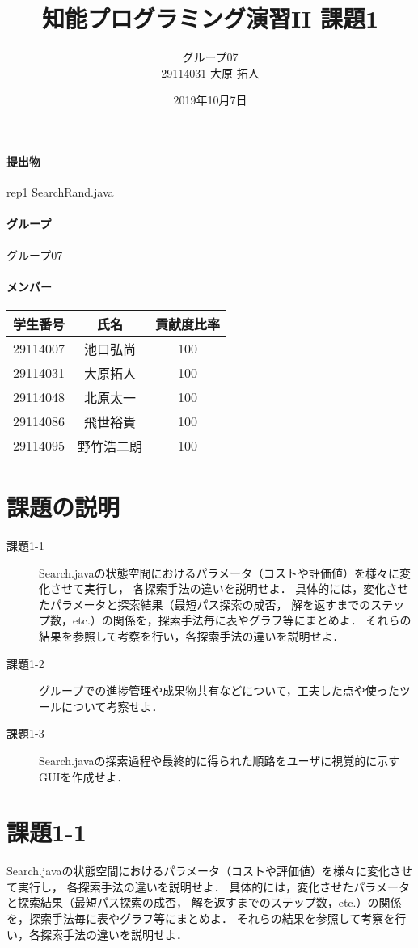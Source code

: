 \documentclass{jarticle}
\title{知能プログラミング演習II 課題1}
\author{グループ07\\
  29114031 大原 拓人\\
}
\date{2019年10月7日}
\begin{document}
\maketitle

\paragraph{提出物} rep1 SearchRand.java
\paragraph{グループ} グループ07
\paragraph{メンバー}
\begin{tabular}{|c|c|c|}
  \hline
  学生番号&氏名&貢献度比率\\
  \hline\hline
  29114007&池口弘尚&100\\
  \hline
  29114031&大原拓人&100\\
  \hline
  29114048&北原太一&100\\
  \hline
  29114086&飛世裕貴&100\\
  \hline
  29114095&野竹浩二朗&100\\
  \hline
\end{tabular}

\section{課題の説明}
\begin{description}
\item[課題1-1] Search.javaの状態空間におけるパラメータ（コストや評価値）を様々に変化させて実行し，
  各探索手法の違いを説明せよ．
  具体的には，変化させたパラメータと探索結果（最短パス探索の成否，
  解を返すまでのステップ数，etc.）の関係を，探索手法毎に表やグラフ等にまとめよ．
  それらの結果を参照して考察を行い，各探索手法の違いを説明せよ．
\item[課題1-2] グループでの進捗管理や成果物共有などについて，工夫した点や使ったツールについて考察せよ．
\item[課題1-3] Search.javaの探索過程や最終的に得られた順路をユーザに視覚的に示すGUIを作成せよ．
\end{description}


\section{課題1-1}
\begin{screen}
  Search.javaの状態空間におけるパラメータ（コストや評価値）を様々に変化させて実行し，
  各探索手法の違いを説明せよ．
  具体的には，変化させたパラメータと探索結果（最短パス探索の成否，
  解を返すまでのステップ数，etc.）の関係を，探索手法毎に表やグラフ等にまとめよ．
  それらの結果を参照して考察を行い，各探索手法の違いを説明せよ．
\end{screen}
\end{document}
